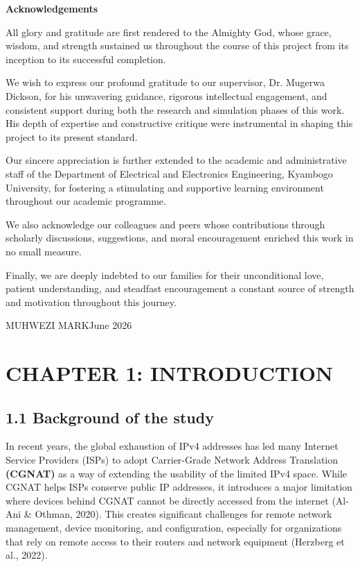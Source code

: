 \documentclass[12pt,a4paper,oneside]{report}
\begin{document}
\clearpage



\textbf{Acknowledgements}


All glory and gratitude are first rendered to the Almighty God, whose grace, wisdom, and strength sustained us throughout the course of this project from its inception to its successful completion.


We wish to express our profound gratitude to our supervisor, Dr. Mugerwa Dickson, for his unwavering guidance, rigorous intellectual engagement, and consistent support during both the research and simulation phases of this work. His depth of expertise and constructive critique were instrumental in shaping this project to its present standard.


Our sincere appreciation is further extended to the academic and administrative staff of the Department of Electrical and Electronics Engineering, Kyambogo University, for fostering a stimulating and supportive learning environment throughout our academic programme.


We also acknowledge our colleagues and peers whose contributions through scholarly discussions, suggestions, and moral encouragement enriched this work in no small measure.


Finally, we are deeply indebted to our families for their unconditional love, patient understanding, and steadfast encouragement a constant source of strength and motivation throughout this journey.


MUHWEZI MARKJune 2026






\chapter{CHAPTER 1: INTRODUCTION}

\section{1.1 Background of the study}

In recent years, the global exhaustion of IPv4 addresses has led many Internet Service Providers (ISPs) to adopt Carrier-Grade Network Address Translation \textbf{(CGNAT) }as a way of extending the usability of the limited IPv4 space. While CGNAT helps ISPs conserve public IP addresses, it introduces a major limitation where devices behind CGNAT cannot be directly accessed from the internet (Al-Ani \& Othman, 2020). This creates significant challenges for remote network management, device monitoring, and configuration, especially for organizations that rely on remote access to their routers and network equipment (Herzberg et al., 2022).
\end{document}
